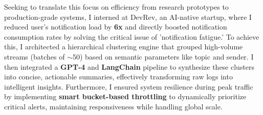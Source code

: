 \documentclass[12pt]{article}
\begin{document}
\vspace{0.5em}
Seeking to translate this focus on efficiency from research prototypes to production-grade systems, I interned at DevRev, an AI-native startup, where I reduced user's notification load by \textbf{6x} and directly boosted notification consumption rates by solving the critical issue of 'notification fatigue.' To achieve this, I architected a hierarchical clustering engine that grouped high-volume streams (batches of $\sim$50) based on semantic parameters like topic and sender. I then integrated a \textbf{GPT-4} and \textbf{LangChain} pipeline to synthesize these clusters into concise, actionable summaries, effectively transforming raw logs into intelligent insights. Furthermore, I ensured system resilience during peak traffic by implementing \textbf{smart bucket-based throttling} to dynamically prioritize critical alerts, maintaining responsiveness while handling global scale.

\end{document}
